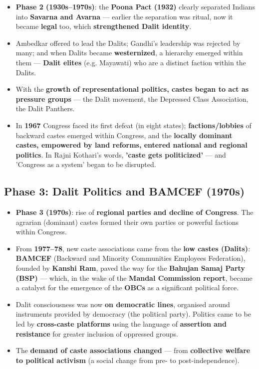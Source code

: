 \begin{KeyConcept}
\begin{itemize}
\item \textbf{Phase 2 (1930s--1970s)}: the \textbf{Poona Pact (1932)} clearly separated Indians into \textbf{Savarna and Avarna} --- earlier the separation was ritual, now it became \textbf{legal} too, which \textbf{strengthened Dalit identity}.
\item Ambedkar offered to lead the Dalits; Gandhi's leadership was rejected by many; and when Dalits became \textbf{westernized}, a hierarchy emerged within them --- \textbf{Dalit elites} (e.g. Mayawati) who are a distinct faction within the Dalits.
\item With the \textbf{growth of representational politics, castes began to act as pressure groups} --- the Dalit movement, the Depressed Class Association, the Dalit Panthers.
\item In \textbf{1967} Congress faced its first defeat (in eight states); \textbf{factions/lobbies} of backward castes emerged within Congress, and the \textbf{locally dominant castes, empowered by land reforms, entered national and regional politics}. In Rajni Kothari's words, \textbf{'caste gets politicized'} --- and 'Congress as a system' began to be disrupted.
\end{itemize}
\end{KeyConcept}

\subsection{Phase 3: Dalit Politics and BAMCEF (1970s)}

\begin{KeyConcept}
\begin{itemize}
\item \textbf{Phase 3 (1970s)}: rise of \textbf{regional parties and decline of Congress}. The agrarian (dominant) castes formed their own parties or powerful factions within Congress.
\item From \textbf{1977--78}, new caste associations came from the \textbf{low castes (Dalits)}: \textbf{BAMCEF} (Backward and Minority Communities Employees Federation), founded by \textbf{Kanshi Ram}, paved the way for the \textbf{Bahujan Samaj Party (BSP)} --- which, in the wake of the \textbf{Mandal Commission report}, became a catalyst for the emergence of the \textbf{OBCs} as a significant political force.
\item Dalit consciousness was now \textbf{on democratic lines}, organised around instruments provided by democracy (the political party). Politics came to be led by \textbf{cross-caste platforms} using the language of \textbf{assertion and resistance} for greater inclusion of oppressed groups.
\item The \textbf{demand of caste associations changed} --- from \textbf{collective welfare to political activism} (a social change from pre- to post-independence).
\end{itemize}
\end{KeyConcept}

